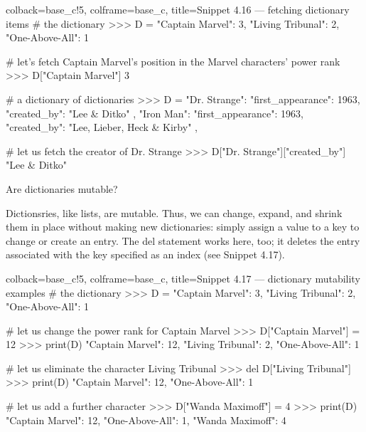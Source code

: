 \documentclass[a4paper,11pt]{book}
\numberwithin{figure}{chapter}
\numberwithin{table}{chapter}
\newcommand{\question}[1]{%
    \begin{tcolorbox}[colback=comp_c!10,colframe=comp_c,sidebyside align=top,width=\linewidth,before skip=1ex]
        #1
    \end{tcolorbox}
    \switchcolumn%
}
\newcommand{\note}[1]{%
    \begin{tcolorbox}[colback=white!0,colframe=white!10,width=\linewidth,before skip=1ex]
        #1
    \end{tcolorbox}
}
\begin{document}
\begin{pythoncode}[linenos=true,]{colback=base_c!5, colframe=base_c, title=\sffamily Snippet 4.16 --- fetching dictionary items}
# the dictionary 
>>> D = {"Captain Marvel": 3, "Living Tribunal": 2, "One-Above-All": 1}

# let's fetch Captain Marvel's position in the Marvel characters' power rank
>>> D["Captain Marvel"]
3

# a dictionary of dictionaries
>>> D = {
	"Dr. Strange": {
		"first_appearance": 1963,
		"created_by": "Lee & Ditko"
		},
	"Iron Man": {
		"first_appearance": 1963,
		"created_by": "Lee, Lieber, Heck & Kirby"
		},
    } 

# let us fetch the creator of Dr. Strange 
>>> D["Dr. Strange"]["created_by"]
"Lee & Ditko"
\end{pythoncode}

\begin{paracol}{2}
\question{\raggedright Are dictionaries mutable?}
\note{Dictionsries, like lists, are mutable. Thus, we can change, expand, and shrink them in place without making new dictionaries: simply assign a value to a key to change or create an entry. The del statement works here, too; it deletes the entry associated with the key specified as an index (see Snippet 4.17).}
\end{paracol}
\clearpage

\begin{pythoncode}[linenos=true,]{colback=base_c!5, colframe=base_c, title=\sffamily Snippet 4.17 --- dictionary mutability examples}
# the dictionary 
>>> D = {"Captain Marvel": 3, "Living Tribunal": 2, "One-Above-All": 1}

# let us change the power rank for Captain Marvel
>>> D["Captain Marvel"] = 12
>>> print(D)
{"Captain Marvel": 12, "Living Tribunal": 2, "One-Above-All": 1}

# let us eliminate the character Living Tribunal 
>>> del D["Living Tribunal"]
>>> print(D)
{"Captain Marvel": 12, "One-Above-All": 1}

# let us add a further character 
>>> D["Wanda Maximoff"] = 4
>>> print(D)
{"Captain Marvel": 12, "One-Above-All": 1, "Wanda Maximoff": 4}

\end{pythoncode}
\end{document}

